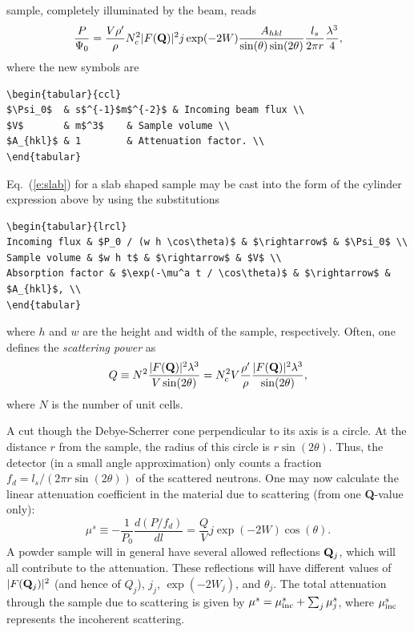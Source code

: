 sample, completely illuminated by the beam, reads \cite{bacon}
\begin{equation}
\frac{P}{\Psi_0} =
 \frac{V \rho'}{\rho} N_c^2 |F({\bf Q})|^2 j \exp(-2W)
                    \frac{A_{hkl}}{\sin(\theta)\sin(2\theta)}
                    \frac{l_s}{2\pi r} \frac{\lambda^3}{4} ,
\end{equation}
where the new symbols are
%
\begin{lstlisting}\begin{tabular}{ccl}
$\Psi_0$  & s$^{-1}$m$^{-2}$ & Incoming beam flux \\
$V$       & m$^3$    & Sample volume \\
$A_{hkl}$ & 1        & Attenuation factor. \\
\end{tabular}\end{lstlisting}
%
Eq.\ (\ref{e:slab}) for a slab shaped sample
may be cast into the form of the cylinder expression above
by using the substitutions
%
\begin{lstlisting}\begin{tabular}{lrcl}
Incoming flux & $P_0 / (w h \cos\theta)$ & $\rightarrow$ & $\Psi_0$ \\
Sample volume & $w h t$ & $\rightarrow$ & $V$ \\
Absorption factor & $\exp(-\mu^a t / \cos\theta)$ & $\rightarrow$ & $A_{hkl}$, \\
\end{tabular}\end{lstlisting}
%
where $h$ and $w$ are the height and width of the sample, respectively.
Often, one defines the {\em scattering power} as
\begin{equation}
Q \equiv N^2 \frac{|F({\bf Q})|^2 \lambda^3}{V \sin(2\theta)}
 = N_c^2 V \frac{\rho'}{\rho} \frac{|F({\bf Q})|^2 \lambda^3}{\sin(2\theta)} ,
\end{equation}
where $N$ is the number of unit cells.

A cut though the Debye-Scherrer cone perpendicular to its axis
is a circle. At the distance $r$ from the sample, the radius of this
circle is $r \sin(2\theta)$. Thus, the detector (in a small angle
approximation) only counts a fraction $f_d = l_s / (2 \pi r \sin(2 \theta))$
of the scattered neutrons.
One may now calculate the
linear attenuation coefficient in the material due to scattering
(from one {\bf Q}-value only):
\begin{equation}
\label{e:attenu}
\mu^s \equiv -\frac{1}{P_0} \frac{d(P/f_d)}{dl}
  = \frac{Q}{V} j \exp(-2W) \cos(\theta) .
\end{equation}
A powder sample will in general have several allowed reflections
${\bf Q}_j$, which will all contribute to the attenuation.
These reflections will have different values of
$|F({\bf Q}_j)|^2$ (and hence of $Q_j$), $j_j$, $\exp(-2W_j)$,
and $\theta_j$.
The total attenuation through the sample due to scattering is given by
$\mu^s = \mu_{\rm inc}^s + \sum_j \mu^s_j $,
where $\mu_{\rm inc}^s$ represents the incoherent scattering.


